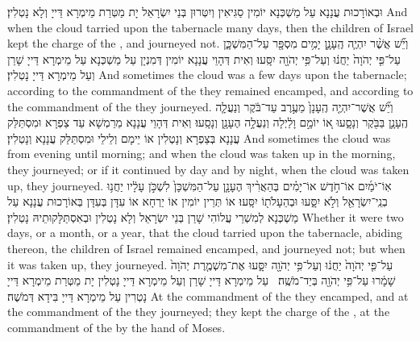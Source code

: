 {וּבְאוֹרָכוּת עֲנָנָא עַל מַשְׁכְּנָא יוֹמִין סַגִּיאִין וְיִטְּרוּן בְּנֵי יִשְׂרָאֵל יָת מַטְּרַת מֵימְרָא דַּייָ וְלָא נָטְלִין׃}
{And when the cloud tarried upon the tabernacle many days, then the children of Israel kept the charge of the \lord, and journeyed not.}{}
{וְיֵ֞שׁ אֲשֶׁ֨ר יִהְיֶ֧ה הֶֽעָנָ֛ן יָמִ֥ים מִסְפָּ֖ר עַל־הַמִּשְׁכָּ֑ן עַל־פִּ֤י יְהֹוָה֙ יַחֲנ֔וּ וְעַל־פִּ֥י יְהֹוָ֖ה יִסָּֽעוּ׃
}
{וְאִית דְּהָוֵי עֲנָנָא יוֹמִין דְּמִנְיָן עַל מַשְׁכְּנָא עַל מֵימְרָא דַּייָ שָׁרַן וְעַל מֵימְרָא דַּייָ נָטְלִין׃}
{And sometimes the cloud was a few days upon the tabernacle; according to the commandment of the \lord\space they remained encamped, and according to the commandment of the \lord\space they journeyed.}{}
{וְיֵ֞שׁ אֲשֶׁר־יִהְיֶ֤ה הֶֽעָנָן֙ מֵעֶ֣רֶב עַד־בֹּ֔קֶר וְנַעֲלָ֧ה הֶֽעָנָ֛ן בַּבֹּ֖קֶר וְנָסָ֑עוּ א֚וֹ יוֹמָ֣ם וָלַ֔יְלָה וְנַעֲלָ֥ה הֶעָנָ֖ן וְנָסָֽעוּ׃}
{וְאִית דְּהָוֵי עֲנָנָא מֵרַמְשָׁא עַד צַפְרָא וּמִסְתַּלַּק עֲנָנָא בְּצַפְרָא וְנָטְלִין אוֹ יֵימָם וְלֵילֵי וּמִסְתַּלַּק עֲנָנָא וְנָטְלִין׃}
{And sometimes the cloud was from evening until morning; and when the cloud was taken up in the morning, they journeyed; or if it continued by day and by night, when the cloud was taken up, they journeyed.}{}
{אֽוֹ־יֹמַ֜יִם אוֹ־חֹ֣דֶשׁ אוֹ־יָמִ֗ים בְּהַאֲרִ֨יךְ הֶעָנָ֤ן עַל־הַמִּשְׁכָּן֙ לִשְׁכֹּ֣ן עָלָ֔יו יַחֲנ֥וּ בְנֵֽי־יִשְׂרָאֵ֖ל וְלֹ֣א יִסָּ֑עוּ וּבְהֵעָלֹת֖וֹ יִסָּֽעוּ׃
}
{אוֹ תְּרֵין יוֹמִין אוֹ יַרְחָא אוֹ עִדָּן בְּעִדָּן בְּאוֹרָכוּת עֲנָנָא עַל מַשְׁכְּנָא לְמִשְׁרֵי עֲלוֹהִי שָׁרַן בְּנֵי יִשְׂרָאֵל וְלָא נָטְלִין וּבְאִסְתַּלָּקוּתֵיהּ נָטְלִין׃}
{Whether it were two days, or a month, or a year, that the cloud tarried upon the tabernacle, abiding thereon, the children of Israel remained encamped, and journeyed not; but when it was taken up, they journeyed.}{}
{עַל־פִּ֤י יְהֹוָה֙ יַחֲנ֔וּ וְעַל־פִּ֥י יְהֹוָ֖ה יִסָּ֑עוּ אֶת־מִשְׁמֶ֤רֶת יְהֹוָה֙ שָׁמָ֔רוּ עַל־פִּ֥י יְהֹוָ֖ה בְּיַד־מֹשֶֽׁה׃ \petucha }
{עַל מֵימְרָא דַּייָ שָׁרַן וְעַל מֵימְרָא דַּייָ נָטְלִין יָת מַטְּרַת מֵימְרָא דַּייָ נָטְרִין עַל מֵימְרָא דַּייָ בִּידָא דְּמֹשֶׁה׃}
{At the commandment of the \lord\space they encamped, and at the commandment of the \lord\space they journeyed; they kept the charge of the \lord, at the commandment of the \lord\space by the hand of Moses.}{}
